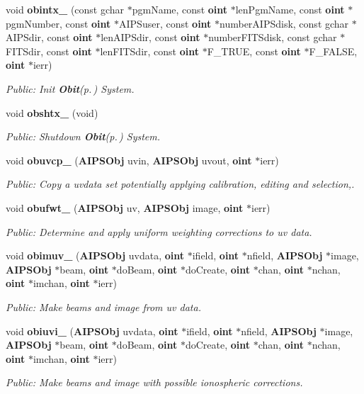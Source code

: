 \begin{CompactItemize}
\item 
void {\bf obintx\_\-} (const gchar $\ast$pgm\-Name, const {\bf oint} $\ast$len\-Pgm\-Name, const {\bf oint} $\ast$pgm\-Number, const {\bf oint} $\ast$AIPSuser, const {\bf oint} $\ast$number\-AIPSdisk, const gchar $\ast$AIPSdir, const {\bf oint} $\ast$len\-AIPSdir, const {\bf oint} $\ast$number\-FITSdisk, const gchar $\ast$FITSdir, const {\bf oint} $\ast$len\-FITSdir, const {\bf oint} $\ast$F\_\-TRUE, const {\bf oint} $\ast$F\_\-FALSE, {\bf oint} $\ast$ierr)
\begin{CompactList}\small\item\em Public: Init {\bf Obit}{\rm (p.\,\pageref{structObit})} System. \item\end{CompactList}\item 
void {\bf obshtx\_\-} (void)
\begin{CompactList}\small\item\em Public: Shutdown {\bf Obit}{\rm (p.\,\pageref{structObit})} System. \item\end{CompactList}\item 
void {\bf obuvcp\_\-} ({\bf AIPSObj} uvin, {\bf AIPSObj} uvout, {\bf oint} $\ast$ierr)
\begin{CompactList}\small\item\em Public: Copy a uvdata set potentially applying calibration, editing and selection,. \item\end{CompactList}\item 
void {\bf obufwt\_\-} ({\bf AIPSObj} uv, {\bf AIPSObj} image, {\bf oint} $\ast$ierr)
\begin{CompactList}\small\item\em Public: Determine and apply uniform weighting corrections to uv data. \item\end{CompactList}\item 
void {\bf obimuv\_\-} ({\bf AIPSObj} uvdata, {\bf oint} $\ast$ifield, {\bf oint} $\ast$nfield, {\bf AIPSObj} $\ast$image, {\bf AIPSObj} $\ast$beam, {\bf oint} $\ast$do\-Beam, {\bf oint} $\ast$do\-Create, {\bf oint} $\ast$chan, {\bf oint} $\ast$nchan, {\bf oint} $\ast$imchan, {\bf oint} $\ast$ierr)
\begin{CompactList}\small\item\em Public: Make beams and image from uv data. \item\end{CompactList}\item 
void {\bf obiuvi\_\-} ({\bf AIPSObj} uvdata, {\bf oint} $\ast$ifield, {\bf oint} $\ast$nfield, {\bf AIPSObj} $\ast$image, {\bf AIPSObj} $\ast$beam, {\bf oint} $\ast$do\-Beam, {\bf oint} $\ast$do\-Create, {\bf oint} $\ast$chan, {\bf oint} $\ast$nchan, {\bf oint} $\ast$imchan, {\bf oint} $\ast$ierr)
\begin{CompactList}\small\item\em Public: Make beams and image with possible ionospheric corrections. \item\end{CompactList}\end{CompactItemize}
